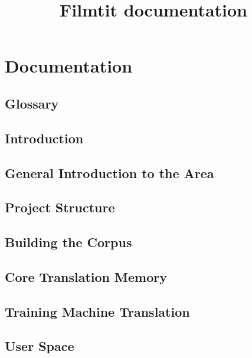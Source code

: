 \documentclass[11pt, oneside]{book}
\title{Filmtit documentation}
\author{}
\begin{document}



\tableofcontents
\sloppy

\newpage

\setcounter{page}{1}

\part{Documentation}


\chapter*{Glossary}



\chapter{Introduction}


\chapter{General Introduction to the Area}


\chapter{Project Structure}


%

\chapter{Building the Corpus}


\chapter{Core Translation Memory}


\chapter{Training Machine Translation}


\chapter{User Space}

\end{document}
